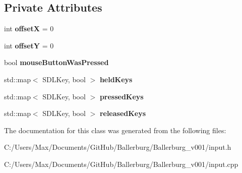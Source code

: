 \subsection*{Private Attributes}
\begin{DoxyCompactItemize}
\item 
int {\bfseries offset\+X} = 0\label{class_input_a1d4a76ad638234b05b67e4342868815c}

\item 
int {\bfseries offset\+Y} = 0\label{class_input_a2d134a0288a6638bc59f35602c33f8d1}

\item 
bool {\bfseries mouse\+Button\+Was\+Pressed}\label{class_input_a71ef8f9f55cd0391ccf9012d88f0ed13}

\item 
std\+::map$<$ S\+D\+L\+Key, bool $>$ {\bfseries held\+Keys}\label{class_input_ac7eae67ebd03e0570dd4e0fdd6610e8f}

\item 
std\+::map$<$ S\+D\+L\+Key, bool $>$ {\bfseries pressed\+Keys}\label{class_input_a37741f7dc7f6aae418ebbc7a36203424}

\item 
std\+::map$<$ S\+D\+L\+Key, bool $>$ {\bfseries released\+Keys}\label{class_input_ad130fe0fb7085b9cc52faaff155d4e38}

\end{DoxyCompactItemize}


The documentation for this class was generated from the following files\+:\begin{DoxyCompactItemize}
\item 
C\+:/\+Users/\+Max/\+Documents/\+Git\+Hub/\+Ballerburg/\+Ballerburg\+\_\+v001/input.\+h\item 
C\+:/\+Users/\+Max/\+Documents/\+Git\+Hub/\+Ballerburg/\+Ballerburg\+\_\+v001/input.\+cpp\end{DoxyCompactItemize}

